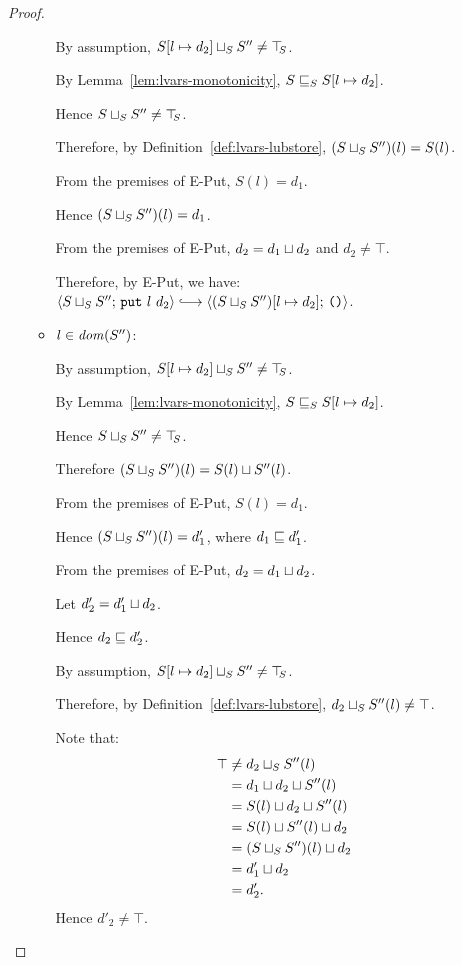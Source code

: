 \begin{proof}
\begin{itemize}
\begin{itemize}
          By assumption, $S[l \mapsto d_2] \sqcup_{S} S'' \neq
          \top\hspace{-0.85mm}_{S}$.

          By Lemma~\ref{lem:lvars-monotonicity},
          $S \sqsubseteq_S S[l \mapsto d_2]$.

          Hence $S \sqcup_{S} S'' \neq \top\hspace{-0.85mm}_{S}$.

          Therefore, by Definition~\ref{def:lvars-lubstore},
          $(S \sqcup_{S} S'')(l) = S(l)$.

          From the premises of {\sc E-Put}, $S(l) = d_1$.

          Hence $(S \sqcup_{S} S'')(l) = d_1$.

          From the premises of {\sc E-Put}, $d_2 = d_1 \sqcup d_2$
          and $d_2 \neq \top$.

          Therefore, by {\sc E-Put}, we have:
          $\config{\lubstore{S}{S''}}{\putexp{l}{d_2}} \parstepsto
          \config{\extSRaw{(\lubstore{S}{S''})}{l}{d_2}}{\unit}$.

        \item $l \in \mathit{dom}(S'')$:

          By assumption, $S[l \mapsto d_2] \sqcup_{S} S'' \neq
          \top\hspace{-0.85mm}_{S}$.

          By Lemma~\ref{lem:lvars-monotonicity},
          $S \sqsubseteq_S S[l \mapsto d_2]$.

          Hence $S \sqcup_{S} S'' \neq \top\hspace{-0.85mm}_{S}$.

          Therefore $(S \sqcup_{S} S'')(l) = S(l) \sqcup S''(l)$.

          From the premises of {\sc E-Put}, $S(l) = d_1$.
          
          Hence $(S \sqcup_{S} S'')(l) = d'_1$, where $d_1 \sqsubseteq
          d'_1$.

          From the premises of {\sc E-Put}, $d_2 =
          d_1 \sqcup d_2$.

          Let $d'_2 = d'_1 \sqcup d_2$.

          Hence $d_2 \sqsubseteq d'_2$.

          By assumption, $S[l \mapsto d_2] \sqcup_{S} S'' \neq
          \top\hspace{-0.85mm}_{S}$.

          Therefore, by Definition~\ref{def:lvars-lubstore},
          $d_2 \sqcup_{S} S''(l) \neq \top$.

          Note that:
          \begin{align*}
            \top &\neq d_2 \sqcup_{S} S''(l) \\ &=
            d_1 \sqcup d_2 \sqcup S''(l) \\ &=
            S(l) \sqcup d_2 \sqcup S''(l) \\ &=
            S(l) \sqcup S''(l) \sqcup d_2 \\ &=
            (S \sqcup_{S} S'')(l) \sqcup d_2 \\ &=
            d'_1 \sqcup d_2 \\ &= d'_2. \\
          \end{align*}
          Hence $d'_2 \neq \top$.


\end{itemize}
\end{itemize}
\end{proof}
